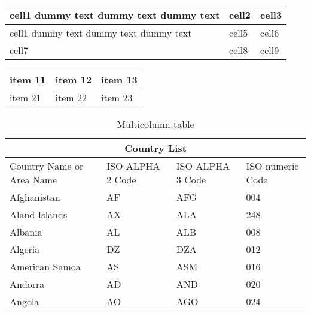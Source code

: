\documentclass{article}
\begin{document}
\vspace{1cm}

\begin{center}
\begin{tabular}{ | m{5em} | m{1cm}| m{1cm} | } 
  \hline
  cell1 dummy text dummy text dummy text& cell2 & cell3 \\ 
  \hline
  cell1 dummy text dummy text dummy text & cell5 & cell6 \\ 
  \hline
  cell7 & cell8 & cell9 \\ 
  \hline
\end{tabular}
\end{center}

\newpage

\begin{tabularx}{0.8\textwidth} { | >{\raggedright\arraybackslash}X | >{\centering\arraybackslash}X | >{\raggedleft\arraybackslash}X | }
   \hline
   item 11 & item 12 & item 13 \\
   \hline
   item 21  & item 22  & item 23  \\
   \hline
\end{tabularx}


\newpage

\begin{table}[h!]
\caption{Multicolumn table}
\begin{tabular}{ |p{3cm}||p{3cm}|p{3cm}|p{3cm}|  }
 \hline
 \multicolumn{4}{|c|}{Country List} \\
 \hline
 Country Name	 or Area Name& ISO ALPHA 2 Code	&ISO ALPHA 3 Code&ISO numeric Code\\
 \hline
 Afghanistan	& AF	&AFG&	004\\
 Aland Islands&	AX	& ALA	&248\\
 Albania	&AL	& ALB&	008\\
 Algeria	&DZ	& DZA&	012\\
 American Samoa&	AS	& ASM&016\\
 Andorra&	AD	& AND	&020\\
 Angola&	AO	& AGO&024\\
  \hline
 \end{tabular}
 \end{table}
\end{document}
